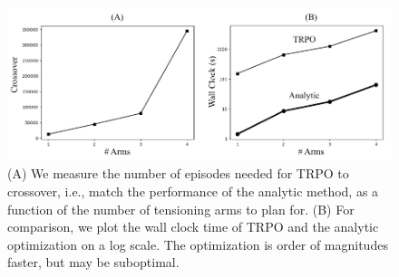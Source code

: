 \begin{figure}[ht]
\includegraphics[width=\columnwidth]{tps-experiments/trpo-6.png}
\caption{(A) We measure the number of episodes needed for TRPO to crossover, i.e., match the performance of the analytic method, as a function of the number of tensioning arms to plan for. (B) For comparison, we plot the wall clock time of TRPO and the analytic optimization on a log scale. The optimization is order of magnitudes faster, but may be suboptimal. \label{fig:2}}
\end{figure}

